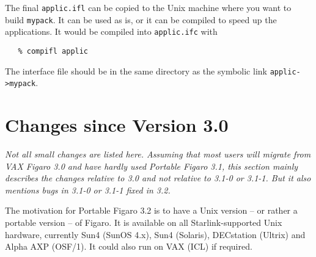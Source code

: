 The final {\tt applic.ifl} can be copied to the Unix machine where you want
to build {\tt mypack}. It can be used as is, or it can be compiled to speed up
the applications. It would be compiled into {\tt applic.ifc} with
\begin{verbatim}
   % compifl applic
\end{verbatim}
The interface file should be in the same directory as
the symbolic link {\tt applic->mypack}.


\section{Changes since Version 3.0}
\label{changes}

{\it Not all small changes are listed here.  Assuming that most users
will migrate from VAX Figaro 3.0 and have hardly used Portable Figaro
3.1, this section mainly describes the changes relative to 3.0 and not
relative to 3.1-0 or 3.1-1.  But it also mentions bugs in 3.1-0 or 3.1-1
fixed in 3.2.}

The motivation for Portable Figaro 3.2 is to have a Unix version -- or
rather a portable version -- of Figaro. It is available on all
Starlink-supported Unix hardware, currently Sun4 (SunOS 4.x), Sun4
(Solaris), DECstation (Ultrix) and Alpha AXP (OSF/1).  It could also run
on VAX (ICL) if required.

